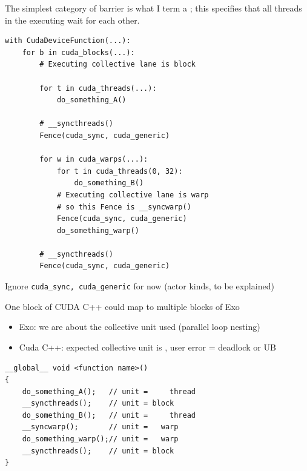 \begin{minipage}[t]{0.48\textwidth}\fixminipage
The simplest category of barrier is what I term a ; this specifies that all threads in the executing  wait for each other.

\begin{verbatim}
with CudaDeviceFunction(...):
    for b in cuda_blocks(...):
        # Executing collective lane is block

        for t in cuda_threads(...):
            do_something_A()

        # __syncthreads()
        Fence(cuda_sync, cuda_generic)

        for w in cuda_warps(...):
            for t in cuda_threads(0, 32):
                do_something_B()
            # Executing collective lane is warp
            # so this Fence is __syncwarp()
            Fence(cuda_sync, cuda_generic)
            do_something_warp()

        # __syncthreads()
        Fence(cuda_sync, cuda_generic)
\end{verbatim}
\end{minipage}
\hfill
\begin{minipage}[t]{0.48\textwidth}\fixminipage
Ignore \texttt{cuda\_sync, cuda\_generic} for now (actor kinds, to be explained)

One block of CUDA C++ could map to multiple blocks of Exo
\begin{itemize}
\item Exo: we are  about the collective unit used (parallel loop nesting)
\item Cuda C++: expected collective unit is , user error = deadlock or UB
\end{itemize}


\begin{verbatim}
__global__ void <function name>()
{
    do_something_A();   // unit =     thread
    __syncthreads();    // unit = block
    do_something_B();   // unit =     thread
    __syncwarp();       // unit =   warp
    do_something_warp();// unit =   warp
    __syncthreads();    // unit = block
}
\end{verbatim}
\end{minipage}

\newpage
{}

